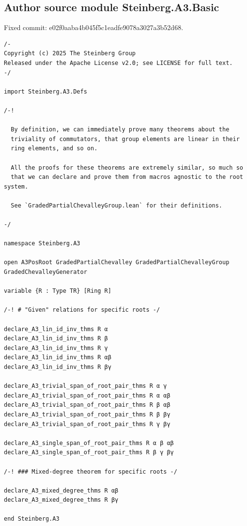 \documentclass[10pt,a4paper]{article}
\begin{document}
\subsection*{Author source module Steinberg.A3.Basic}
\noindent Fixed commit: e02f0aaba4b045f5c1eadfe9078a3027a3b52d68.
\begin{Verbatim}
/-
Copyright (c) 2025 The Steinberg Group
Released under the Apache License v2.0; see LICENSE for full text.
-/

import Steinberg.A3.Defs

/-!

  By definition, we can immediately prove many theorems about the
  triviality of commutators, that group elements are linear in their
  ring elements, and so on.

  All the proofs for these theorems are extremely similar, so much so
  that we can declare and prove them from macros agnostic to the root system.

  See `GradedPartialChevalleyGroup.lean` for their definitions.

-/

namespace Steinberg.A3

open A3PosRoot GradedPartialChevalley GradedPartialChevalleyGroup GradedChevalleyGenerator

variable {R : Type TR} [Ring R]

/-! # "Given" relations for specific roots -/

declare_A3_lin_id_inv_thms R α
declare_A3_lin_id_inv_thms R β
declare_A3_lin_id_inv_thms R γ
declare_A3_lin_id_inv_thms R αβ
declare_A3_lin_id_inv_thms R βγ

declare_A3_trivial_span_of_root_pair_thms R α γ
declare_A3_trivial_span_of_root_pair_thms R α αβ
declare_A3_trivial_span_of_root_pair_thms R β αβ
declare_A3_trivial_span_of_root_pair_thms R β βγ
declare_A3_trivial_span_of_root_pair_thms R γ βγ

declare_A3_single_span_of_root_pair_thms R α β αβ
declare_A3_single_span_of_root_pair_thms R β γ βγ

/-! ### Mixed-degree theorem for specific roots -/

declare_A3_mixed_degree_thms R αβ
declare_A3_mixed_degree_thms R βγ

end Steinberg.A3
\end{Verbatim}
\end{document}
